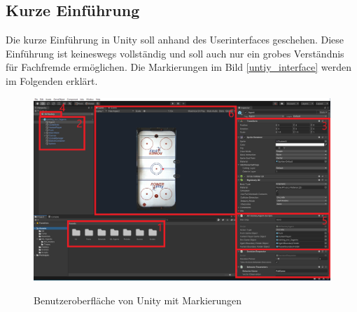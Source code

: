 \subsection{Kurze Einführung}
\label{subsect:Kurze Einführung}

Die kurze Einführung in Unity soll anhand des Userinterfaces geschehen. Diese Einführung ist keineswegs vollständig und soll auch nur ein grobes Verständnis für Fachfremde ermöglichen. Die Markierungen im Bild \ref{untiy_interface} werden im Folgenden erklärt.

\begin{figure}
\includegraphics[scale=0.3]{images/unity_interface_marked}
\label{unity_interface_pic}
\caption{Benutzeroberfläche von Unity mit Markierungen}
\end{figure}

